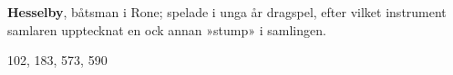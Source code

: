 \textbf{Hesselby}, båtsman i Rone; spelade i unga år dragspel, efter vilket instrument samlaren upptecknat en ock annan »stump» i samlingen.

102, 183, 573, 590 
